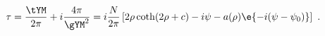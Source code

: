 \begin{equation}
\label{tau}
  \tau = \frac{\tYM}{2\pi} +i \frac{4\pi}{\gYM^2} 
  =i \frac{N}{2\pi} \left[ 2\rho \coth(2\rho+c) -i\psi -a(\rho)
  \e{-i(\psi-\psi_0)} \right]~.
\end{equation}

